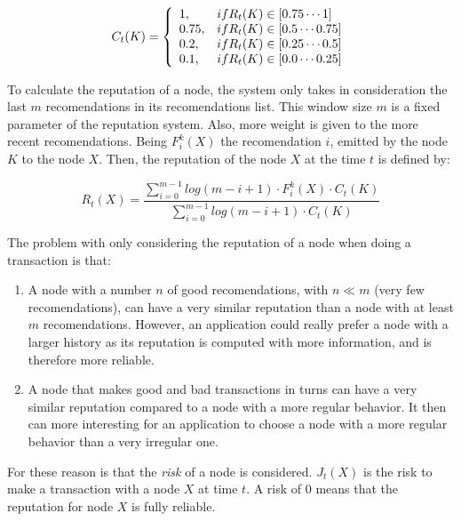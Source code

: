 \begin{equation}
  C_t (K) = \left\{
  \begin{array}{l l}
    1, & if R_t(K) \in [0.75 \cdots 1]\\
    0.75, & if R_t(K) \in [0.5 \cdots 0.75]\\
    0.2,  & if R_t(K) \in [0.25 \cdots 0.5]\\
    0.1, & if R_t(K) \in [0.0 \cdots 0.25]\\
  \end{array}\right.
\end{equation}

To calculate the reputation of a node, the system only takes in consideration
the last $m$ recomendations in its recomendations list. This window size $m$ is
a fixed parameter of the reputation system. Also, more weight is given to the
more recent recomendations. 
Being $F_i^k (X)$ the recomendation $i$, emitted by the node $K$ to the node
$X$. Then, the reputation of the node $X$ at the time $t$ is defined by:

\begin{equation}
  R_t(X) = \frac{\sum_{i=0}^{m-1}  log(m-i+1) \cdot F_i^k(X) \cdot C_t(K)}{
\sum_{i=0}^{m-1} log(m-i+1) \cdot C_t(K)}
\end{equation}


The problem with only considering the reputation of a node when doing a
transaction is that:
\begin{enumerate}
  \item A node with a number $n$ of good recomendations, with $n \ll m$ (very
few recomendations), can have a very similar reputation than a node with at
least $m$ recomendations. However, an application could really prefer a node
with a larger history as its reputation is computed with more information, and
is therefore more reliable.
  \item A node that makes good and bad transactions in turns can have a very
similar reputation compared to a node with a more regular behavior. It then can
more interesting for an application to choose a node with a more regular
behavior than a very irregular one.

\end{enumerate}

For these reason is that the \textit{risk} of a node is considered. $J_t(X)$ is
the risk to make a transaction with a node $X$ at time $t$. A risk of 0
means that the reputation for node $X$ is fully reliable.


